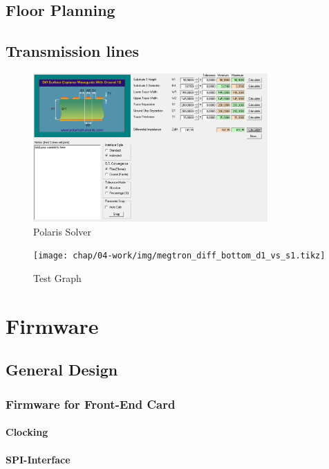 \subsection{Floor Planning}
\subsection{Transmission lines}

\begin{figure}[tbh]
	\centering
	\includegraphics[width = 0.8\textwidth]{chap/04-work/img/polaris}
	\caption{Polaris Solver}
	\label{fig:polaris}
\end{figure}

\begin{figure}[tbh]
	\centering
	\texttt{[image: chap/04-work/img/megtron\_diff\_bottom\_d1\_vs\_s1.tikz]}
	\caption{Test Graph}
	\label{fig:megtron}
\end{figure}

  
\newpage
\section{Firmware}
\subsection{General Design}
\subsubsection{Firmware for Front-End Card}
\paragraph{Clocking}
\paragraph{SPI-Interface}
